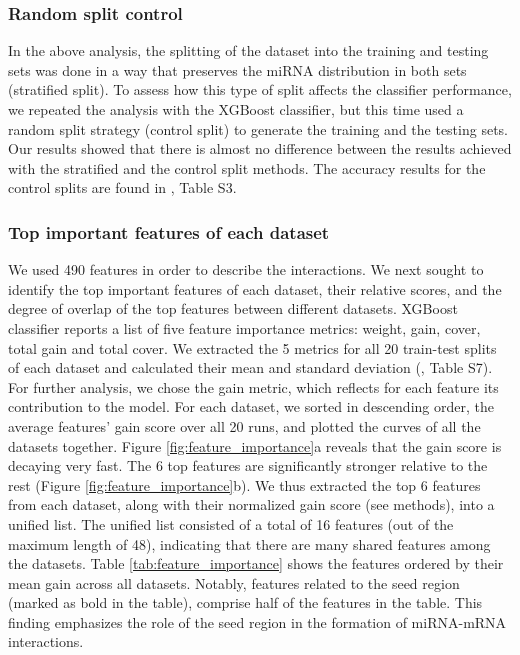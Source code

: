 \documentclass{bmcart}
\begin{document}
\subsubsection*{Random split control}
In the above analysis, the splitting of the dataset into the training and testing sets was done in a way that preserves the miRNA distribution in both sets (stratified split). To assess how this type of split affects the classifier performance, we repeated the analysis with the XGBoost classifier, but this time used a random split strategy (control split) to generate the training and the testing sets. Our results showed that there is almost no difference between the results achieved with the stratified and the control split methods. The accuracy results for the control splits are found in , Table S3.

\subsubsection*{Top important features of each dataset}
We used 490 features in order to describe the interactions. We next sought to identify the top important features of each dataset, their relative scores, and the degree of overlap of the top features between different datasets. XGBoost classifier reports a list of five feature importance metrics: weight, gain, cover, total gain and total cover. We extracted the 5 metrics for all 20 train-test splits of each dataset and calculated their mean and standard deviation (, Table S7).
For further analysis, we chose the gain metric, which reflects for each feature its contribution to the model. For each dataset, we sorted in descending order, the average features' gain score over all 20 runs, and plotted the curves of all the datasets together.
Figure \ref{fig:feature_importance}a reveals that the gain score is decaying very fast. The 6 top features are significantly stronger relative to the rest (Figure \ref{fig:feature_importance}b). We thus extracted the top 6 features from each dataset, along with their normalized gain score (see methods), into a unified list. The unified list consisted of a total of 16 features (out of the maximum length of 48), indicating that there are many shared features among the datasets. Table \ref{tab:feature_importance} shows the features ordered by their mean gain across all datasets.
Notably, features related to the seed region (marked as bold in the table), comprise half of the features in the table. This finding emphasizes the role of the seed region in the formation of miRNA-mRNA interactions.
\end{document}
